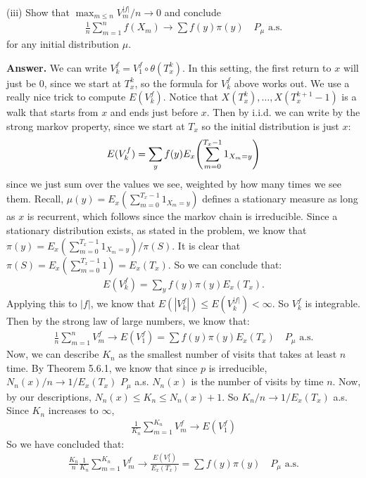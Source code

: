 \documentclass[12pt]{article}
\begin{document}
    (iii) Show that $\max_{m \leq n} V^{|f|}_m/n \to 0$ and conclude
    \begin{align*}
        \frac 1n \sum_{m=1}^n f(X_m) \to \sum f(y) \pi(y) \quad P_\mu \text{ a.s.}
    \end{align*}
    for any initial distribution $\mu$.
    
    \textbf{Answer.}
    We can write $V_k^f = V_1^f \circ \theta(T^{k}_x)$. In this setting, the first return to $x$ will just be 0, since we start at $T^k_x$, so the formula for $V_k^f$ above works out. We use a really nice trick to compute $E(V_k^f)$. Notice that $X(T^k_x), \ldots, X(T^{k+1}_x - 1)$ is a walk that starts from $x$ and ends just before $x$. Then by i.i.d. we can write by the strong markov property, since we start at $T_x$ so the initial distribution is just $x$:
    \begin{align*}
        E(V_k^f) = \sum_y f(y) E_x \qty(\sum_{m=0}^{T_x - 1} 1_{X_m = y})
    \end{align*}
    since we just sum over the values we see, weighted by how many times we see them. Recall, $\mu(y) = E_x(\sum_{m=0}^{T_x - 1} 1_{X_m = y})$ defines a stationary measure as long as $x$ is recurrent, which follows since the markov chain is irreducible. Since a stationary distribution exists, as stated in the problem, we know that $\pi(y) = E_x(\sum_{m=0}^{T_x - 1} 1_{X_m = y}) / \pi(S)$. It is clear that $\pi(S) = E_x(\sum_{m=0}^{T_x - 1} 1) = E_x(T_x)$. So we can conclude that:
    \begin{align*}
        E(V_k^f) = \sum_y f(y) \pi(y) E_x(T_x).
    \end{align*}
    Applying this to $|f|$, we know that $E(|V_k^f|) \leq E(V_k^{|f|}) < \infty$. So $V_k^f$ is integrable.
    Then by the strong law of large numbers, we know that:
    \begin{align*}
        \frac 1n \sum_{m=1}^n V_m^f \to E(V_1^f) = \sum f(y) \pi(y) E_x(T_x) \quad P_\mu \text{ a.s.}
    \end{align*}
    Now, we can describe $K_n$ as the smallest number of visits that takes at least $n$ time. By Theorem 5.6.1, we know that since $p$ is irreducible, $N_n(x)/n \to 1/E_x(T_x)$ $P_\mu$ a.s. $N_n(x)$ is the number of visits by time $n$. Now, by our descriptions, $N_n(x) \leq K_n \leq N_n(x) + 1$. So $K_n/n \to 1/E_x(T_x)$ a.s. Since $K_n$ increases to $\infty$, 
    \begin{align*}
        \frac{1}{K_n} \sum_{m=1}^{K_n} V_m^f \to E(V_1^f)
    \end{align*}
    So we have concluded that:
    \begin{align*}
        \frac{K_n}{n} \frac{1}{K_n} \sum_{m=1}^{K_n} V_m^f \to \frac{E(V_1^f)}{E_x(T_x)} = \sum f(y) \pi(y) \quad P_\mu \text{ a.s.}
    \end{align*}
\end{document}
